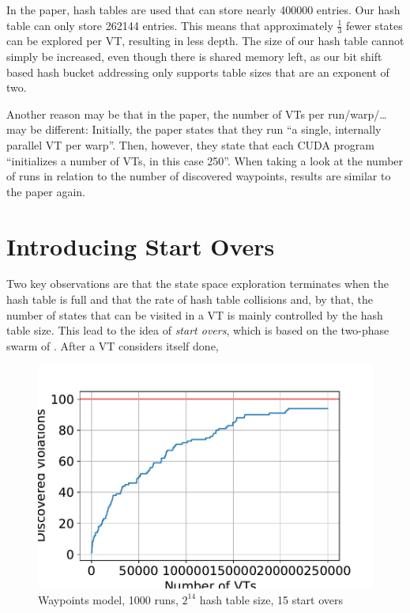 \documentclass[
fancyheadings, %
%
%
]{stsreprt}
\begin{document}
In the paper, hash tables are used that can store nearly \num{400000} entries.
Our hash table can only store \num{262144} entries.
This means that approximately $\frac{1}{3}$ fewer states can be explored per VT, resulting in less depth.
The size of our hash table cannot simply be increased, even though there is shared memory left, as our bit shift based hash bucket addressing only supports table sizes that are an exponent of two.

Another reason may be that in the paper, the number of VTs per run/warp/\dots may be different:
Initially, the paper states that they run \enquote{a single, internally parallel VT per warp}.
Then, however, they state that each CUDA program \enquote{initializes a number of VTs, in this case 250}.
When taking a look at the number of runs in relation to the number of discovered waypoints, results are similar to the paper again.


\section{Introducing Start Overs}

Two key observations are that the state space exploration terminates when the hash table is full and that the rate of hash table collisions and, by that, the number of states that can be visited in a VT is mainly controlled by the hash table size.
This lead to the idea of \emph{start overs}, which is based on the two-phase swarm of \cite{DeFrancisco2020.Grapple}.
After a VT considers itself done,

\begin{figure}[h]
    \centering
    \includegraphics[width=.5\textwidth]{figures/experiments/output2-discovered-violations-abs-numbers.pdf}
    \caption{Waypoints model, \num{1000} runs, $2^{14}$ hash table size, 15 start overs}
    \label{fig:experiments:output2}
\end{figure}
\end{document}
